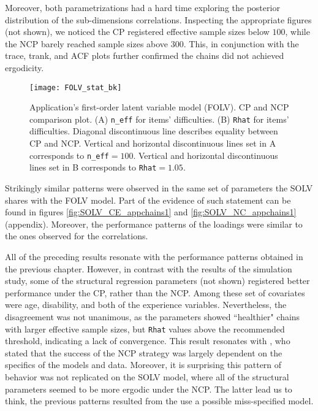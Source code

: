 Moreover, both parametrizations had a hard time exploring the posterior distribution of the sub-dimensions correlations. Inspecting the appropriate figures (not shown), we noticed the CP registered effective sample sizes below $100$, while the NCP barely reached sample sizes above $300$. This, in conjunction with the trace, trank, and ACF plots further confirmed the chains did not achieved ergodicity.
%
\begin{figure}[H]
	\centering
	\texttt{[image: FOLV\_stat\_bk]}
	\caption[Application's first-order latent variable model (FOLV). CP and NCP comparison plot.]%
	{Application's first-order latent variable model (FOLV). CP and NCP comparison plot. (A) \texttt{n\_eff} for items' difficulties. (B) \texttt{Rhat} for items' difficulties. Diagonal discontinuous line describes equality between CP and NCP. Vertical and horizontal discontinuous lines set in A corresponds to \texttt{n\_eff}$=100$. Vertical and horizontal discontinuous lines set in B corresponds to \texttt{Rhat}$=1.05$.}
	\label{fig:FOLV_stat1}
\end{figure}

Strikingly similar patterns were observed in the same set of parameters the SOLV shares with the FOLV model. Part of the evidence of such statement can be found in figures \ref{fig:SOLV_CE_appchains1} and \ref{fig:SOLV_NC_appchains1} (appendix). Moreover, the performance patterns of the loadings were similar to the ones observed for the correlations.

All of the preceding results resonate with the performance patterns obtained in the previous chapter. However, in contrast with the results of the simulation study, some of the structural regression parameters (not shown) registered better performance under the CP, rather than the NCP. Among these set of covariates were age, disability, and both of the experience variables. Nevertheless, the disagreement was not unanimous, as the parameters showed ``healthier" chains with larger effective sample sizes, but \texttt{Rhat} values above the recommended threshold, indicating a lack of convergence. This result resonates with \citet{Papaspiliopoulos_et_al_2007}, who stated that the success of the NCP strategy was largely dependent on the specifics of the models and data. Moreover, it is surprising this pattern of behavior was not replicated on the SOLV model, where all of the structural parameters seemed to be more ergodic under the NCP. The latter lead us to think, the previous patterns resulted from the use a possible miss-specified model.

